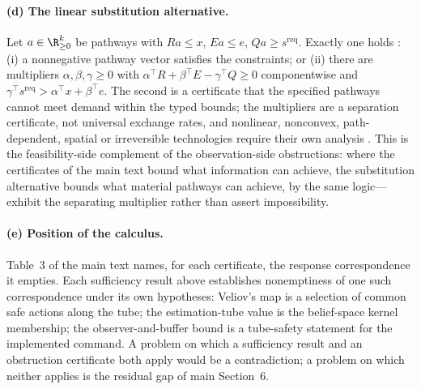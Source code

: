 \paragraph{(d) The linear substitution alternative.} Let $a\in\R^k_{\ge0}$ be pathways with $Ra\le x$, $Ea\le e$, $Qa\ge s^{\mathrm{req}}$. Exactly one holds \citep{farkas1902,gale1960}: (i) a nonnegative pathway vector satisfies the constraints; or (ii) there are multipliers $\alpha,\beta,\gamma\ge0$ with $\alpha^\top R+\beta^\top E-\gamma^\top Q\ge0$ componentwise and $\gamma^\top s^{\mathrm{req}}>\alpha^\top x+\beta^\top e$. The second is a certificate that the specified pathways cannot meet demand within the typed bounds; the multipliers are a separation certificate, not universal exchange rates, and nonlinear, nonconvex, path-dependent, spatial or irreversible technologies require their own analysis \citep{abaee2026aggregate}. This is the feasibility-side complement of the observation-side obstructions: where the certificates of the main text bound what information can achieve, the substitution alternative bounds what material pathways can achieve, by the same logic---exhibit the separating multiplier rather than assert impossibility.

\paragraph{(e) Position of the calculus.} Table~3 of the main text names, for each certificate, the response correspondence it empties. Each sufficiency result above establishes nonemptiness of one such correspondence under its own hypotheses: Veliov's map is a selection of common safe actions along the tube; the estimation-tube value is the belief-space kernel membership; the observer-and-buffer bound is a tube-safety statement for the implemented command. A problem on which a sufficiency result and an obstruction certificate both apply would be a contradiction; a problem on which neither applies is the residual gap of main Section~6.
